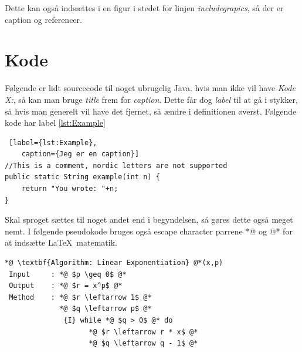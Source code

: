 \documentclass[a4, danish]{article}
\begin{document}
\begin{center}
\end{center}

\noindent Dette kan også indsættes i en figur i stedet for linjen \emph{includegrapics}, så der er caption og referencer.

\section{Kode}
Følgende er lidt sourcecode til noget ubrugelig Java. hvis man ikke vil have \emph{Kode X:}, så kan man bruge \emph{title} frem for \emph{caption}. Dette får dog \emph{label} til at gå i stykker, så hvis man generelt vil have det fjernet, så ændre i definitionen øverst. Følgende kode har label \ref{lst:Example}

\begin{lstlisting} [label={lst:Example},
	caption={Jeg er en caption}]
//This is a comment, nordic letters are not supported
public static String example(int n) {
	return "You wrote: "+n;
}
\end{lstlisting}

Skal sproget sættes til noget andet end i begyndelsen, så gøres dette også meget nemt. I følgende pseudokode bruges også escape character parrene *@ og @* for at indsætte \LaTeX\ matematik.

\begin{lstlisting}[language=pseudocode,
                firstnumber=1,
                caption={The algorithm \emph{linear exponentiation}},
                label={lst:algorithm}]
*@ \textbf{Algorithm: Linear Exponentiation} @*(x,p)
 Input     : *@ $p \geq 0$ @*
 Output    : *@ $r = x^p$ @*
 Method    : *@ $r \leftarrow 1$ @*
             *@ $q \leftarrow p$ @*
              {I} while *@ $q > 0$ @* do
                    *@ $r \leftarrow r * x$ @*
                    *@ $q \leftarrow q - 1$ @*
\end{lstlisting}
\end{document}
